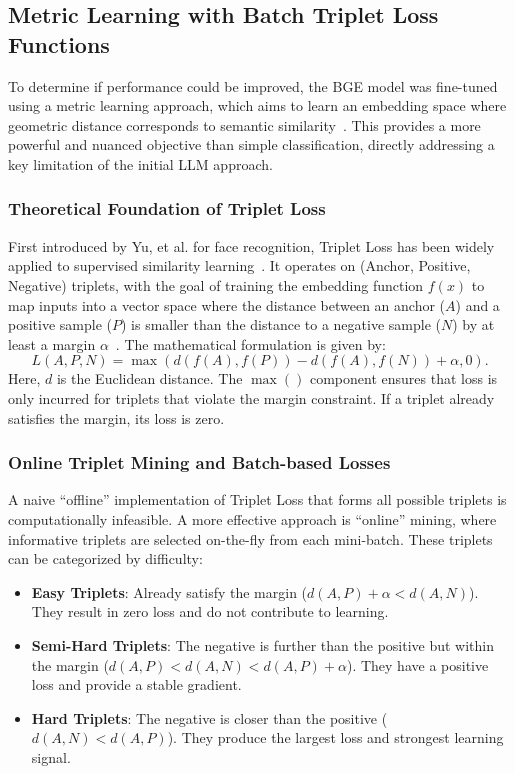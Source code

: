 \subsection{Metric Learning with Batch Triplet Loss Functions}\label{ch:3.3.2}
To determine if performance could be improved, the BGE model was fine-tuned using a metric learning approach, which aims to learn an embedding space where geometric distance corresponds to semantic similarity~\cite{mohan2023deepmetriclearningcomputer}. This provides a more powerful and nuanced objective than simple classification, directly addressing a key limitation of the initial LLM approach.

\subsubsection{Theoretical Foundation of Triplet Loss}\label{ch:3.3.2.1}
First introduced by Yu, et al. for face recognition, Triplet Loss has been widely applied to supervised similarity learning~\cite{Yu2020}. It operates on (Anchor, Positive, Negative) triplets, with the goal of training the embedding function \(f(x)\) to map inputs into a vector space where the distance between an anchor (\(A\)) and a positive sample (\(P\)) is smaller than the distance to a negative sample (\(N\)) by at least a margin \(\alpha\)~\cite{Schroff_2015_CVPR, hermans2017defensetripletlossperson, mohan2023deepmetriclearningcomputer}. The mathematical formulation is given by:
\[ L(A,P,N)=\max(d(f(A),f(P))-d(f(A),f(N))+\alpha,0). \]
Here, \(d\) is the Euclidean distance. The \(\max()\) component ensures that loss is only incurred for triplets that violate the margin constraint. If a triplet already satisfies the margin, its loss is zero.

\subsubsection{Online Triplet Mining and Batch-based Losses}\label{ch:3.3.2.2}
A naive ``offline'' implementation of Triplet Loss that forms all possible triplets is computationally infeasible. A more effective approach is ``online'' mining, where informative triplets are selected on-the-fly from each mini-batch. These triplets can be categorized by difficulty:
\begin{itemize}
    \item \textbf{Easy Triplets}: Already satisfy the margin (\(d(A,P)+\alpha<d(A,N)\)). They result in zero loss and do not contribute to learning.
    \item \textbf{Semi-Hard Triplets}: The negative is further than the positive but within the margin (\(d(A,P)<d(A,N)<d(A,P)+\alpha\)). They have a positive loss and provide a stable gradient.
    \item \textbf{Hard Triplets}: The negative is closer than the positive (\(d(A,N)<d(A,P)\)). They produce the largest loss and strongest learning signal.
\end{itemize}

